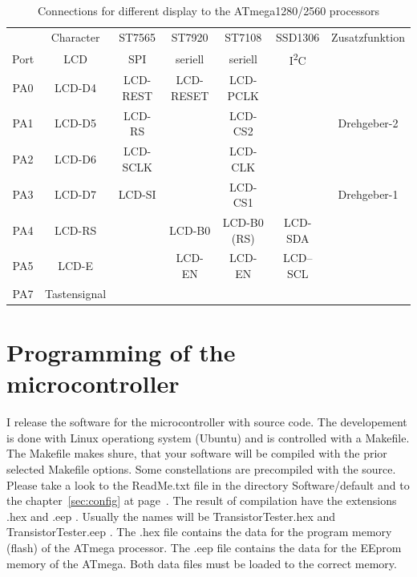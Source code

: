 \begin{table}[H]
  \begin{center}
    \begin{tabular}{| c || c | c | c | c | c | c |}
    \hline
           & Character     &  ST7565     & ST7920       & ST7108       & SSD1306     & Zusatzfunktion \\
      Port & LCD           &    SPI      & seriell      & seriell      &    I\textsuperscript{2}C      & \\
    \hline
    \hline
    PA0    &  LCD-D4       &   LCD-REST  &  LCD-RESET   & LCD-PCLK       &             & \\
    \hline
    PA1    &  LCD-D5       &   LCD-RS    &              & LCD-CS2        &             & Drehgeber-2 \\
    \hline
    PA2    &  LCD-D6       &   LCD-SCLK  &              & LCD-CLK        &             & \\
    \hline
    PA3    &  LCD-D7       &   LCD-SI    &              & LCD-CS1        &             & Drehgeber-1 \\
    \hline
    PA4    &  LCD-RS       &             &   LCD-B0     & LCD-B0 (RS)    &   LCD-SDA   & \\
    \hline
    PA5    &  LCD-E        &             &   LCD-EN     & LCD-EN         &   LCD--SCL  & \\
    \hline
    PA7    &  Tastensignal &             &              &                &             & \\
    \hline
    \end{tabular}
  \end{center}
  \caption{Connections for different display to the ATmega1280/2560 processors}
  \label{tab:display-1280}
\end{table}


\section{Programming of the microcontroller}
I release the software for the microcontroller with source code.
The developement is done with Linux operationg system (Ubuntu) and
is controlled with a Makefile. The Makefile makes shure, that your
software will be compiled with the prior selected Makefile options. Some constellations
are precompiled with the source. Please take a look to the ReadMe.txt file
in the directory Software/default and to the chapter~\ref{sec:config} at page~\pageref{sec:config}.
The result of compilation have the extensions .hex and .eep .
Usually the names will be TransistorTester.hex and TransistorTester.eep .
The .hex file contains the data for the program memory (flash) of the ATmega processor.
The .eep file contains the data for the EEprom memory of the ATmega. Both data files
must be loaded to the correct memory.

